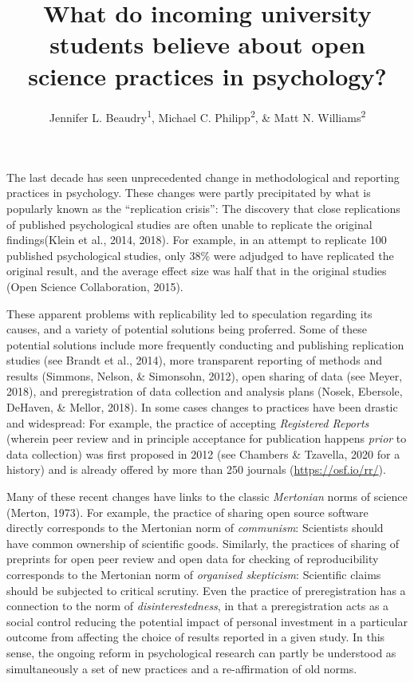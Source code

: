 \documentclass[
  english,
  man,mask,floatsintext]{apa6}
\title{What do incoming university students believe about open science practices in psychology?}
\author{Jennifer L. Beaudry\textsuperscript{1}, Michael C. Philipp\textsuperscript{2}, \& Matt N. Williams\textsuperscript{2}}
\date{}
\affiliation{\vspace{0.5cm}\textsuperscript{1} Swinburne University of Technology\\\textsuperscript{2} Massey University}
\begin{document}
\maketitle

The last decade has seen unprecedented change in methodological and reporting practices in psychology. These changes were partly precipitated by what is popularly known as the \enquote{replication crisis}: The discovery that close replications of published psychological studies are often unable to replicate the original findings(Klein et al., 2014, 2018). For example, in an attempt to replicate 100 published psychological studies, only 38\% were adjudged to have replicated the original result, and the average effect size was half that in the original studies (Open Science Collaboration, 2015).

These apparent problems with replicability led to speculation regarding its causes, and a variety of potential solutions being proferred. Some of these potential solutions include more frequently conducting and publishing replication studies (see Brandt et al., 2014), more transparent reporting of methods and results (Simmons, Nelson, \& Simonsohn, 2012), open sharing of data (see Meyer, 2018), and preregistration of data collection and analysis plans (Nosek, Ebersole, DeHaven, \& Mellor, 2018). In some cases changes to practices have been drastic and widespread: For example, the practice of accepting \emph{Registered Reports} (wherein peer review and in principle acceptance for publication happens \emph{prior} to data collection) was first proposed in 2012 (see Chambers \& Tzavella, 2020 for a history) and is already offered by more than 250 journals (\url{https://osf.io/rr/}).

Many of these recent changes have links to the classic \emph{Mertonian} norms of science (Merton, 1973). For example, the practice of sharing open source software directly corresponds to the Mertonian norm of \emph{communism}: Scientists should have common ownership of scientific goods. Similarly, the practices of sharing of preprints for open peer review and open data for checking of reproducibility corresponds to the Mertonian norm of \emph{organised skepticism}: Scientific claims should be subjected to critical scrutiny. Even the practice of preregistration has a connection to the norm of \emph{disinterestedness}, in that a preregistration acts as a social control reducing the potential impact of personal investment in a particular outcome from affecting the choice of results reported in a given study. In this sense, the ongoing reform in psychological research can partly be understood as simultaneously a set of new practices and a re-affirmation of old norms.
\end{document}

